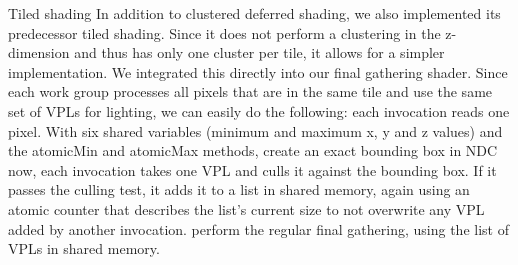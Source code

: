 \begin{outline}
\1 Tiled shading
    \2 In addition to clustered deferred shading, we also implemented its predecessor tiled shading. Since it does not perform a clustering in the z-dimension and thus has only one cluster per tile, it allows for a simpler implementation.
    \2 We integrated this directly into our final gathering shader. Since each work group processes all pixels that are in the same tile and use the same set of VPLs for lighting, we can easily do the following:
        \3 each invocation reads one pixel. With six shared variables (minimum and maximum x, y and z values) and the atomicMin and atomicMax methods, create an exact bounding box in NDC
        \3 now, each invocation takes one VPL and culls it against the bounding box. If it passes the culling test, it adds it to a list in shared memory, again using an atomic counter that describes the list's current size to not overwrite any VPL added by another invocation.
        \3 perform the regular final gathering, using the list of VPLs in shared memory.


\end{outline}


